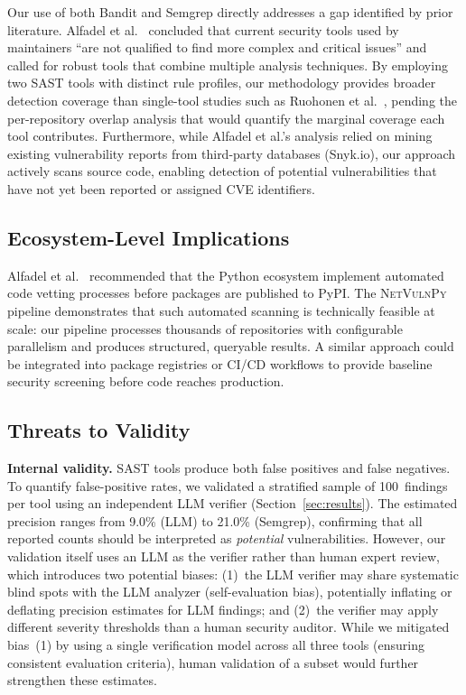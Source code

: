 \documentclass[sigconf,authordraft]{acmart}
\begin{document}
Our use of both Bandit and Semgrep directly addresses a gap identified
by prior literature. Alfadel et al.~\cite{Alfadel2023} concluded that
current security tools used by maintainers ``are not qualified to find
more complex and critical issues'' and called for robust tools that
combine multiple analysis techniques. By employing two SAST tools with
distinct rule profiles, our methodology provides broader detection
coverage than single-tool studies such as Ruohonen et
al.~\cite{Ruohonen2021}, pending the per-repository overlap analysis
that would quantify the marginal coverage each tool contributes.
Furthermore, while Alfadel et al.'s analysis relied on mining existing
vulnerability reports from third-party databases (Snyk.io), our
approach actively scans source code, enabling detection of potential
vulnerabilities that have not yet been reported or assigned CVE
identifiers.

\subsection{Ecosystem-Level Implications}

Alfadel et al.~\cite{Alfadel2023} recommended that the Python
ecosystem implement automated code vetting processes before packages
are published to PyPI. The \textsc{NetVulnPy} pipeline demonstrates
that such automated scanning is technically feasible at scale: our
pipeline processes thousands of repositories with configurable
parallelism and produces structured, queryable results. A similar
approach could be integrated into package registries or CI/CD
workflows to provide baseline security screening before code reaches
production.

\subsection{Threats to Validity}

\textbf{Internal validity.} SAST tools produce both false positives
and false negatives. To quantify false-positive rates, we validated a
stratified sample of 100~findings per tool using an independent LLM
verifier (Section~\ref{sec:results}). The estimated precision ranges
from 9.0\% (LLM) to 21.0\% (Semgrep), confirming that all reported
counts should be interpreted as \emph{potential} vulnerabilities.
However, our validation itself uses an LLM as the verifier rather than
human expert review, which introduces two potential biases: (1)~the
LLM verifier may share systematic blind spots with the LLM analyzer
(self-evaluation bias), potentially inflating or deflating precision
estimates for LLM findings; and (2)~the verifier may apply different
severity thresholds than a human security auditor. While we mitigated
bias~(1) by using a single verification model across all three tools
(ensuring consistent evaluation criteria), human validation of a
subset would further strengthen these estimates.
\end{document}

